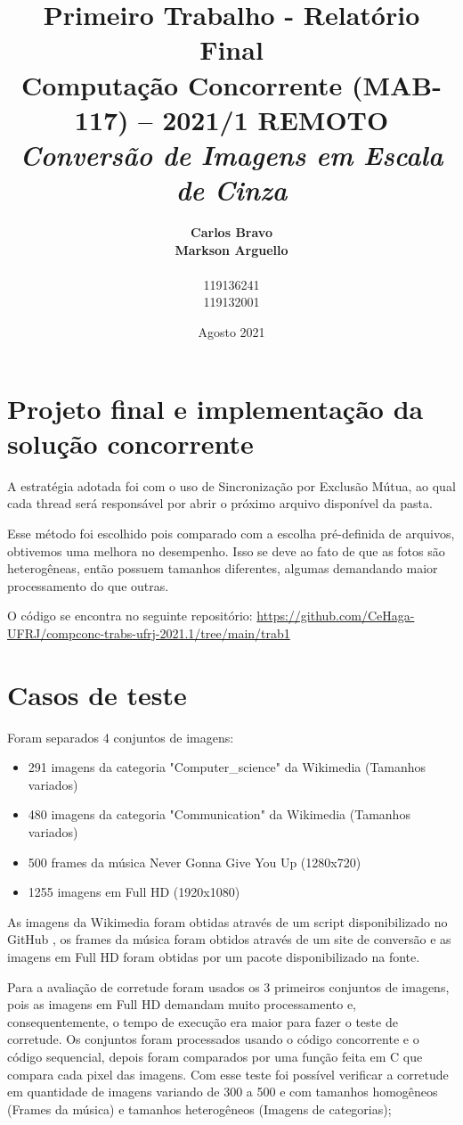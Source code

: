 \documentclass{article}
\title{
    \textbf{Primeiro Trabalho - Relatório Final} \\
     { \large \textbf{Computação Concorrente (MAB-117) -- 2021/1 REMOTO}} \\ 
   \textit{\textbf{Conversão de Imagens em Escala de Cinza}}
    }
\author{\textbf{Carlos Bravo} \\ \textbf{Markson Arguello} \\ \\ 119136241 \\  119132001}
\date{Agosto 2021}
\begin{document}
\maketitle

\section{Projeto final e implementação da solução concorrente}
A estratégia adotada foi com o uso de Sincronização por Exclusão Mútua, ao qual cada thread será responsável por abrir o próximo arquivo disponível da pasta.

Esse método foi escolhido pois comparado com a escolha pré-definida de arquivos, obtivemos uma melhora no desempenho. Isso se deve ao fato de que as fotos são heterogêneas, então possuem tamanhos diferentes, algumas demandando maior processamento do que outras.

O código se encontra no seguinte repositório: \url{https://github.com/CeHaga-UFRJ/compconc-trabs-ufrj-2021.1/tree/main/trab1}

\section{Casos de teste}
Foram separados 4 conjuntos de imagens:
\begin{itemize}
    \item 291 imagens da categoria "Computer\_science" da Wikimedia (Tamanhos variados) \cite{wikimediaCS}
    \item 480 imagens da categoria "Communication" da Wikimedia (Tamanhos variados) \cite{wikimediaComm}
    \item 500 frames da música Never Gonna Give You Up (1280x720) \cite{rickroll}
    \item 1255 imagens em Full HD (1920x1080) \cite{wallpaper}
\end{itemize}

As imagens da Wikimedia foram obtidas através de um script disponibilizado no GitHub \cite{wikimediaScript}, os frames da música foram obtidos através de um site de conversão e as imagens em Full HD foram obtidas por um pacote disponibilizado na fonte. 

Para a avaliação de corretude foram usados os 3 primeiros conjuntos de imagens, pois as imagens em Full HD demandam muito processamento e, consequentemente, o tempo de execução era maior para fazer o teste de corretude. Os conjuntos foram processados usando o código concorrente e o código sequencial, depois foram comparados por uma função feita em C que compara cada pixel das imagens. Com esse teste foi possível verificar a corretude em quantidade de imagens variando de 300 a 500 e com tamanhos homogêneos (Frames da música) e tamanhos heterogêneos (Imagens de categorias);
\end{document}
